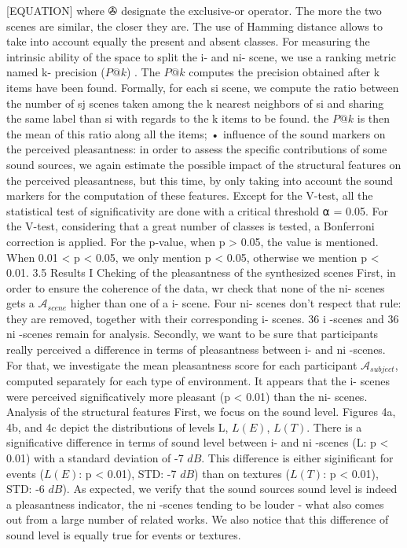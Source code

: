 [EQUATION]
where ✇ designate the exclusive-or operator. The more the two scenes are similar, the closer they are. The use of Hamming distance allows to take into account equally the present and absent classes. For measuring the intrinsic ability of the space to split the i- and ni- scene, we use a ranking metric named k- precision ($P@k$) . The $P@k$ computes the precision obtained after k items have been found. Formally, for each si scene, we compute the ratio between the number of sj scenes taken among the k nearest neighbors of si and sharing the same label than si with regards to the k items to be found. the $P@k$ is then the mean of this ratio along all the items; • influence of the sound markers on the perceived pleasantness: in order to assess the specific contributions of some sound sources, we again estimate the possible impact of the structural features on the perceived pleasantness, but this time, by only taking into account the sound markers for the computation of these features.
Except for the V-test, all the statistical test of significativity are done with a critical threshold ⍺ = 0.05. For the V-test, considering that a great number of classes is tested, a Bonferroni correction is applied. For the p-value, when p > 0.05, the value is mentioned. When 0.01 < p < 0.05, we only mention p < 0.05, otherwise we mention p < 0.01.
3.5 Results I Cheking of the pleasantness of the synthesized scenes First, in order to ensure the coherence of the data, wr check that none of the ni- scenes gets a $\mathcal{A}_{scene}$ higher than one of a i- scene. Four ni- scenes don’t respect that rule: they are removed, together with their corresponding i- scenes. 36 i -scenes and 36 ni -scenes remain for analysis. Secondly, we want to be sure that participants really perceived a difference in terms of pleasantness between i- and ni -scenes. For that, we investigate the mean pleasantness score for each participant $\mathcal{A}_{subject}$, computed separately for each type of environment. It appears that the i- scenes were perceived significatively more pleasant (p < 0.01) than the ni- scenes.
Analysis of the structural features First, we focus on the sound level. Figures 4a, 4b, and 4c depict the distributions of levels L, $L(E)$, $L(T)$. There is a significative difference in terms of sound level between i- and ni -scenes (L: p < 0.01) with a standard deviation of -7 $dB$. This difference is either siginificant for events ($L(E)$: p < 0.01), STD: -7 $dB$) than on textures ($L(T)$: p < 0.01), STD: -6 $dB$). As expected, we verify that the sound sources sound level is indeed a pleasantness indicator, the ni -scenes tending to be louder - what also comes out from a large number of related works. We also notice that this difference of sound level is equally true for events or textures.
